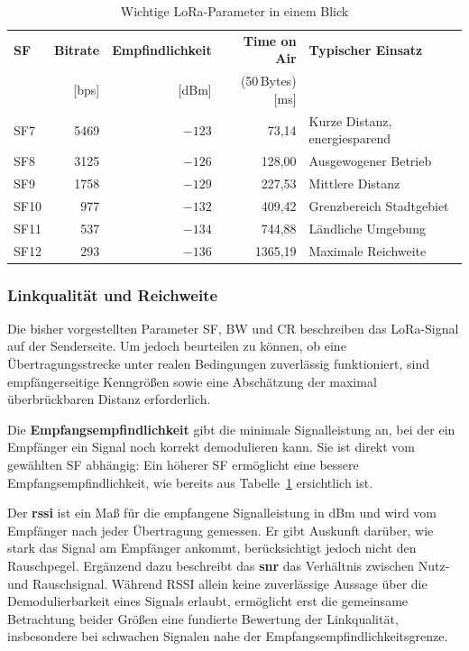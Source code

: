 \begin{table}[htbp]
  \centering
  \caption{Wichtige LoRa-Parameter in einem Blick}
  \label{tab:sf_vergleich}
  \begin{tabular}{@{}lrrrl@{}}
    \toprule
    \textbf{SF} & \textbf{Bitrate} & \textbf{Empfindlichkeit} &
    \textbf{Time on Air} & \textbf{Typischer Einsatz} \\
                & [bps]        & [dBm]              &
    (50\,Bytes) [ms] & \\
    \midrule
    SF7  & 5469 & $-123$ &  73,14 & Kurze Distanz, energiesparend \\
    SF8  & 3125 & $-126$ & 128,00 & Ausgewogener Betrieb \\
    SF9  & 1758 & $-129$ & 227,53 & Mittlere Distanz \\
    SF10 &  977 & $-132$ & 409,42 & Grenzbereich Stadtgebiet \\
    SF11 &  537 & $-134$ & 744,88 & Ländliche Umgebung \\
    SF12 &  293 & $-136$ & 1365,19 & Maximale Reichweite \\
    \bottomrule
  \end{tabular}
\end{table}

\subsubsection*{Linkqualität und Reichweite}
Die bisher vorgestellten Parameter SF, BW und CR beschreiben das LoRa-Signal
auf der Senderseite. Um jedoch beurteilen zu können, ob eine Übertragungsstrecke
unter realen Bedingungen zuverlässig funktioniert, sind empfängerseitige
Kenngrößen sowie eine Abschätzung der maximal überbrückbaren Distanz erforderlich.

Die \textbf{Empfangsempfindlichkeit} gibt die minimale Signalleistung an, bei der ein Empfänger ein Signal noch korrekt
demodulieren kann. Sie ist direkt vom gewählten SF abhängig: Ein höherer SF ermöglicht eine bessere Empfangsempfindlichkeit, 
wie bereits aus Tabelle~\ref{tab:sf_vergleich} ersichtlich ist. 

Der \textbf{\acrfull{rssi}} ist ein Maß für die empfangene Signalleistung in
dBm und wird vom Empfänger nach jeder Übertragung gemessen. Er gibt
Auskunft darüber, wie stark das Signal am Empfänger ankommt, berücksichtigt
jedoch nicht den Rauschpegel. Ergänzend dazu beschreibt das
\textbf{\acrfull{snr}} das Verhältnis zwischen Nutz- und Rauschsignal. Während
RSSI allein keine zuverlässige Aussage über die Demodulierbarkeit eines Signals
erlaubt, ermöglicht erst die gemeinsame Betrachtung beider Größen eine fundierte
Bewertung der Linkqualität, insbesondere bei schwachen Signalen nahe der
Empfangsempfindlichkeitsgrenze.

